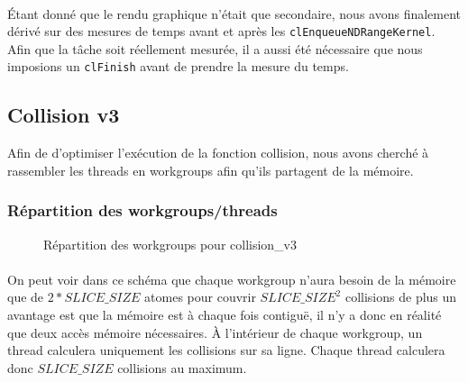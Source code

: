 \documentclass{article}
\begin{document}
\paragraph{}
Étant donné que le rendu graphique n'était que secondaire, nous avons finalement
dérivé sur des mesures de temps avant et après les
\verb!clEnqueueNDRangeKernel!. Afin que la tâche soit réellement mesurée, il
a aussi été nécessaire que nous imposions un \verb!clFinish! avant de prendre
la mesure du temps.

\subsection{Collision v3}
Afin de d'optimiser l'exécution de la fonction collision, nous avons cherché à
rassembler les threads en workgroups afin qu'ils partagent de la mémoire.

\subsubsection{Répartition des workgroups/threads}
\begin{figure}
  \caption{Répartition des workgroups pour collision\_v3}
  \label{collision_v3}
\end{figure}
\paragraph{}
On peut voir dans ce schéma \cite{collison_v3}
 que chaque workgroup n'aura besoin de la mémoire
que de $2 * SLICE\_SIZE$ atomes pour couvrir $SLICE\_SIZE^2$ collisions de plus
un avantage est que la mémoire est à chaque fois contiguë, il n'y a donc en
réalité que deux accès mémoire nécessaires. À l'intérieur de chaque workgroup,
un thread calculera uniquement les collisions sur sa ligne. Chaque thread
calculera donc $SLICE\_SIZE$ collisions au maximum.
\end{document}
